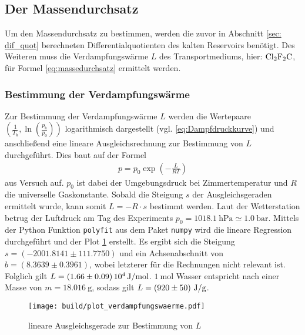 \subsection{Der Massendurchsatz}
Um den Massendurchsatz zu bestimmen, werden die zuvor in Abschnitt \ref{sec: dif_quot}
berechneten Differentialquotienten des kalten Reservoirs benötigt.
Des Weiteren muss die Verdampfungswärme $L$ des Transportmediums, hier: $\ce{Cl2F2C}$, für Formel \eqref{eq:massedurchsatz} ermittelt werden.


\subsubsection{Bestimmung der Verdampfungswärme}
Zur Bestimmung der Verdampfungswärme $L$ werden die Wertepaare $\left(\frac{1}{T_{\text{k}}}, \ln{\left(\frac{p_{\text{k}}}{p_0}\right)}\right)$ logarithmisch dargestellt (vgl. \eqref{eq:Dampfdruckkurve})
und anschließend eine lineare Ausgleichsrechnung zur Bestimmung von $L$ durchgeführt.
Dies baut auf der Formel 
\begin{align*}
    p = p_0 \exp{\left(-\frac{L}{RT}\right)}
\end{align*}
aus Versuch \cite[]{man:v203} auf.
$p_0$ ist dabei der Umgebungsdruck bei Zimmertemperatur und $R$ die universelle Gaskonstante.
Sobald die Steigung $s$ der Ausgleichsgeraden ermittelt wurde, kann somit $L = -R \cdot s$ bestimmt werden.
Laut der Wetterstation \cite*[][]{wetterstation} betrug der Luftdruck am Tag des Experiments
$p_0 = \qty[]{1018.1}{\hecto\pascal} \simeq \qty[]{1.0}{\bar}$.
Mittels der Python \cite[]{python} Funktion \texttt{polyfit} aus dem Paket \texttt{numpy} \cite[]{numpy} wird die lineare Regression durchgeführt und
der Plot \ref{fig:ausgleichsgerade} erstellt.
Es ergibt sich die Steigung $s = \left(\num[]{-2001.8141}\pm \num[]{111.7750} \right)$ und ein Achsenabschnitt von 
$b = \left( \num[]{8.3639} \pm \num[]{0.3961} \right)$, 
wobei letzterer für die Rechnungen nicht relevant ist. 
Folglich gilt $L = \left(1.66 \pm 0.09 \right) 10^{4} \, \unit[]{\joule\per\mol}$. 
$\qty[]{1}{\mol}$ Wasser entspricht nach \cite[]{chemie_schule} einer Masse von $m = \qty[]{18.016}{\gram}$, sodass gilt 
$L = \left(920 \pm 50 \right) \, \unit[]{\joule\per\gram}$.
\begin{figure}
    \texttt{[image: build/plot\_verdampfungswaerme.pdf]}
    \caption[]{lineare Ausgleichsgerade zur Bestimmung von $L$}
    \label{fig:ausgleichsgerade}
\end{figure}

